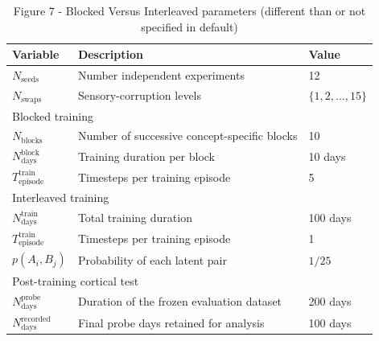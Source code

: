 \documentclass{article}
\begin{document}
\begin{table}[h!]
\centering
\caption{Figure 7 - Blocked Versus Interleaved parameters (different than or not specified in default)}
\label{tab:blocked_interleaved}
\begin{tabular}{lll}
\toprule
\textbf{Variable} & \textbf{Description} & \textbf{Value} \\
\midrule
$N_{\textrm{seeds}}$ & Number independent experiments & 12 \\
$N_{\textrm{swaps}}$ & Sensory-corruption levels & $\{1,2,\ldots,15\}$ \\
\midrule
\multicolumn{3}{l}{Blocked training} \\
$N_{\textrm{blocks}}$ & Number of successive concept-specific blocks & 10 \\
$N_{\textrm{days}}^{\textrm{block}}$ & Training duration per block & 10 days \\
$T_{\textrm{episode}}^{\textrm{train}}$ & Timesteps per training episode & 5 \\
\midrule
\multicolumn{3}{l}{Interleaved training} \\
$N_{\textrm{days}}^{\textrm{train}}$ & Total training duration & 100 days \\
$T_{\textrm{episode}}^{\textrm{train}}$ & Timesteps per training episode & 1 \\
$p(A_i,B_j)$ & Probability of each latent pair & $1/25$ \\
\midrule
\multicolumn{3}{l}{Post-training cortical test} \\
$N_{\textrm{days}}^{\textrm{probe}}$ & Duration of the frozen evaluation dataset & 200 days \\
$N_{\textrm{days}}^{\textrm{recorded}}$ & Final probe days retained for analysis & 100 days \\
\bottomrule
\end{tabular}
\end{table}
\end{document}
